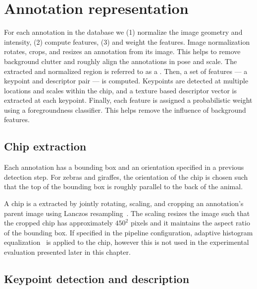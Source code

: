 \section{Annotation representation}\label{sec:annotrepr}
  
    For each annotation in the database we
    (1) normalize the image geometry and intensity,
    (2) compute features,
    (3) and weight the features.
    Image normalization rotates, crops, and resizes an annotation from
      its image.
    This helps to remove background clutter and roughly align the
      annotations in pose and scale.
    The extracted and normalized region is referred to as a
      .
    Then, a set of features ---  a keypoint and descriptor pair --- is
      computed.
    Keypoints are detected at multiple locations and scales within the
      chip, and a texture based descriptor vector is extracted at each
      keypoint.
    Finally, each feature is assigned a probabilistic weight using a
      foregroundness classifier.
    This helps remove the influence of background features.

    \subsection{Chip extraction}

        Each annotation has a bounding box and an orientation specified
          in a previous detection step.
        For zebras and giraffes, the orientation of the chip is chosen
          such that the top of the bounding box is roughly parallel to
          the back of the animal.

        A chip is a extracted by jointly rotating, scaling, and
          cropping an annotation's parent image using Lanczos
          resampling~\cite{lanczos_applied_1988}.
        The scaling resizes the image such that the cropped chip has
          approximately $450^2$ pixels and it maintains the aspect ratio
          of the bounding box.
        If specified in the pipeline configuration, adaptive histogram
          equalization~\cite{pizer_adaptive_1987} is applied to the chip,
          however this is not used in the experimental evaluation
          presented later in this chapter.

    \subsection{Keypoint detection and description}

